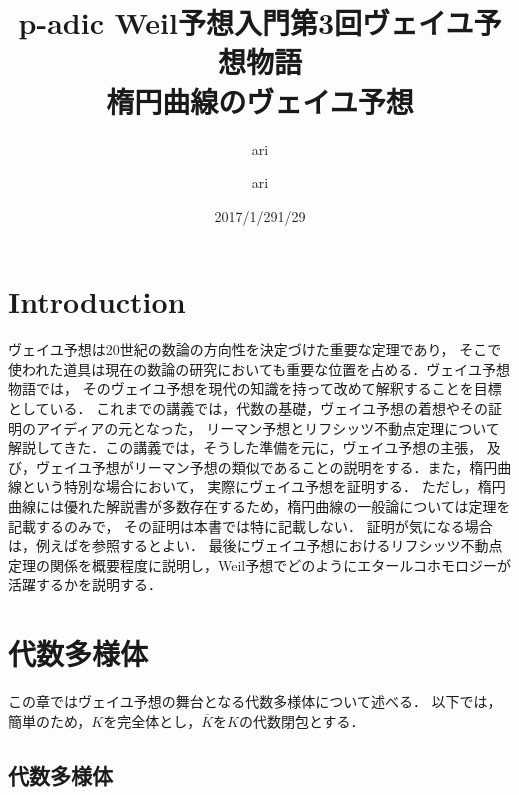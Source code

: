 \documentclass{ujarticle}
\author{ari}
\title{p-adic Weil予想入門}
\date{2017/1/29}
\title{第3回ヴェイユ予想物語 \\ ~楕円曲線のヴェイユ予想~}
\author{ari}
\date{1/29}
\newtheorem*{yodan}{余談，疑問}
\begin{document}
\maketitle
\tableofcontents

\section{Introduction}
\label{sec:Introduction}

ヴェイユ予想は20世紀の数論の方向性を決定づけた重要な定理であり，
そこで使われた道具は現在の数論の研究においても重要な位置を占める．ヴェイユ予想物語では，
そのヴェイユ予想を現代の知識を持って改めて解釈することを目標としている．
これまでの講義では，代数の基礎，ヴェイユ予想の着想やその証明のアイディアの元となった，
リーマン予想とリフシッツ不動点定理について解説してきた．この講義では，そうした準備を元に，ヴェイユ予想の主張，
及び，ヴェイユ予想がリーマン予想の類似であることの説明をする．また，楕円曲線という特別な場合において，
実際にヴェイユ予想を証明する．
ただし，楕円曲線には優れた解説書が多数存在するため，楕円曲線の一般論については定理を記載するのみで，
その証明は本書では特に記載しない．
証明が気になる場合は，例えば\cite{S}を参照するとよい．
最後にヴェイユ予想におけるリフシッツ不動点定理の関係を概要程度に説明し，Weil予想でどのようにエタールコホモロジーが活躍するかを説明する．

\section{代数多様体}
\label{sec:代数多様体}
この章ではヴェイユ予想の舞台となる代数多様体について述べる．
以下では，簡単のため，$K$を完全体とし，$\overline{K}$を$K$の代数閉包とする．

\subsection{代数多様体}
\label{sub:代数多様体}
\end{document}
